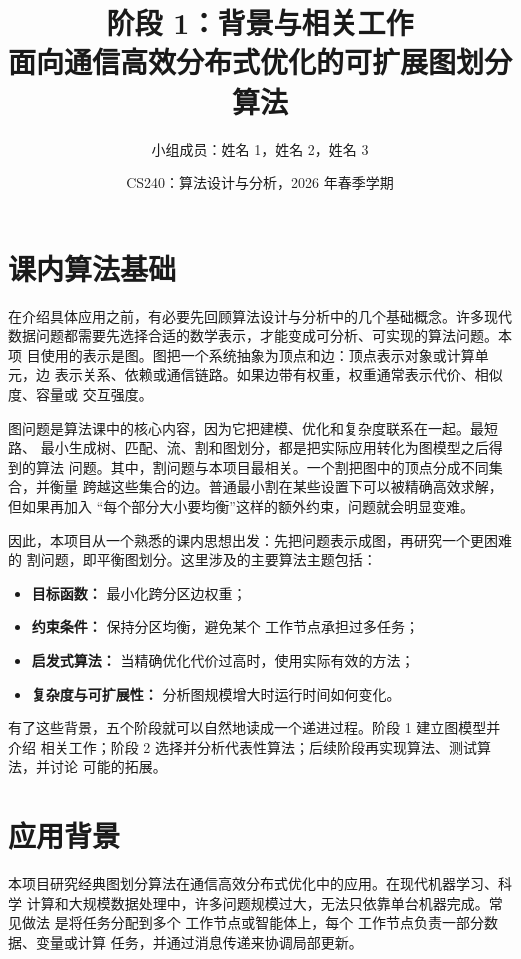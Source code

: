 \documentclass[UTF8, 11pt]{ctexart}
\title{\textbf{阶段 1：背景与相关工作}\\
面向通信高效分布式优化的可扩展图划分算法}
\author{小组成员：姓名 1，姓名 2，姓名 3}
\date{CS240：算法设计与分析，2026 年春季学期}
\begin{document}
\maketitle

\section{课内算法基础}

在介绍具体应用之前，有必要先回顾算法设计与分析中的几个基础概念。许多现代
数据问题都需要先选择合适的数学表示，才能变成可分析、可实现的算法问题。本项
目使用的表示是图。图把一个系统抽象为顶点和边：顶点表示对象或计算单元，边
表示关系、依赖或通信链路。如果边带有权重，权重通常表示代价、相似度、容量或
交互强度。

图问题是算法课中的核心内容，因为它把建模、优化和复杂度联系在一起。最短路、
最小生成树、匹配、流、割和图划分，都是把实际应用转化为图模型之后得到的算法
问题。其中，割问题与本项目最相关。一个割把图中的顶点分成不同集合，并衡量
跨越这些集合的边。普通最小割在某些设置下可以被精确高效求解，但如果再加入
“每个部分大小要均衡”这样的额外约束，问题就会明显变难。

因此，本项目从一个熟悉的课内思想出发：先把问题表示成图，再研究一个更困难的
割问题，即平衡图划分。这里涉及的主要算法主题包括：
\begin{itemize}
    \item \textbf{目标函数：} 最小化跨分区边权重；
    \item \textbf{约束条件：} 保持分区均衡，避免某个 工作节点承担过多任务；
    \item \textbf{启发式算法：} 当精确优化代价过高时，使用实际有效的方法；
    \item \textbf{复杂度与可扩展性：} 分析图规模增大时运行时间如何变化。
\end{itemize}

有了这些背景，五个阶段就可以自然地读成一个递进过程。阶段 1 建立图模型并介绍
相关工作；阶段 2 选择并分析代表性算法；后续阶段再实现算法、测试算法，并讨论
可能的拓展。

\section{应用背景}

本项目研究经典图划分算法在通信高效分布式优化中的应用。在现代机器学习、科学
计算和大规模数据处理中，许多问题规模过大，无法只依靠单台机器完成。常见做法
是将任务分配到多个 工作节点或智能体上，每个 工作节点负责一部分数据、变量或计算
任务，并通过消息传递来协调局部更新。
\end{document}
